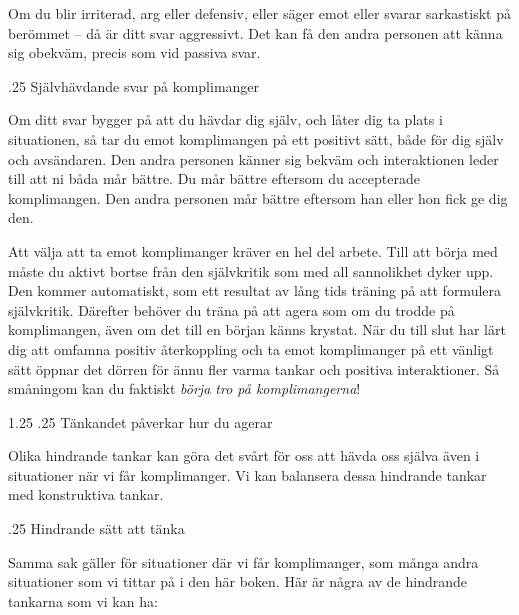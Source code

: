\documentclass[swedish,a4paper]{book}
\makeatletter
\renewcommand\section{\@startsection{section}{1}{\z@}%
                                   {1.25\baselineskip}%
                                   {.25\baselineskip}%
                                   {\fontsize{1.25\baselineskip}{1.25\baselineskip}\selectfont\sffamily\bfseries}} %
\renewcommand\subsection{\@startsection{subsection}{1}{\z@}%
                                   {\baselineskip}%
                                   {.25\baselineskip}%
                                   {\fontsize{1\baselineskip}{1.25\baselineskip}\selectfont\sffamily\bfseries}} %
\makeatother
\begin{document}
Om du blir irriterad, arg eller defensiv, eller säger emot eller svarar sarkastiskt på berömmet -- då är ditt svar aggressivt. Det kan få den andra personen att känna sig obekväm, precis som vid passiva svar.

\subsection{Självhävdande svar på komplimanger}

Om ditt svar bygger på att du hävdar dig själv, och låter dig ta plats i situationen, så tar du emot komplimangen på ett positivt sätt, både för dig själv och avsändaren. Den andra personen känner sig bekväm och interaktionen leder till att ni båda mår bättre. Du mår bättre eftersom du accepterade komplimangen. Den andra personen mår bättre eftersom han eller hon fick ge dig den.

Att välja att ta emot komplimanger kräver en hel del arbete. Till att börja med måste du aktivt bortse från den självkritik som med all sannolikhet dyker upp. Den kommer automatiskt, som ett resultat av lång tids träning på att formulera självkritik. Därefter behöver du träna på att agera som om du trodde på komplimangen, även om det till en början känns krystat. När du till slut har lärt dig att omfamna positiv återkoppling och ta emot komplimanger på ett vänligt sätt öppnar det dörren för ännu fler varma tankar och positiva interaktioner. Så småningom kan du faktiskt \textit{börja tro på komplimangerna}!

\section{Tänkandet påverkar hur du agerar}

Olika hindrande tankar kan göra det svårt för oss att hävda oss själva även i situationer när vi får komplimanger. Vi kan balansera dessa hindrande tankar med konstruktiva tankar.

\subsection{Hindrande sätt att tänka}

Samma sak gäller för situationer där vi får komplimanger, som många andra situationer som vi tittar på i den här boken. Här är några av de hindrande tankarna som vi kan ha:
\end{document}
